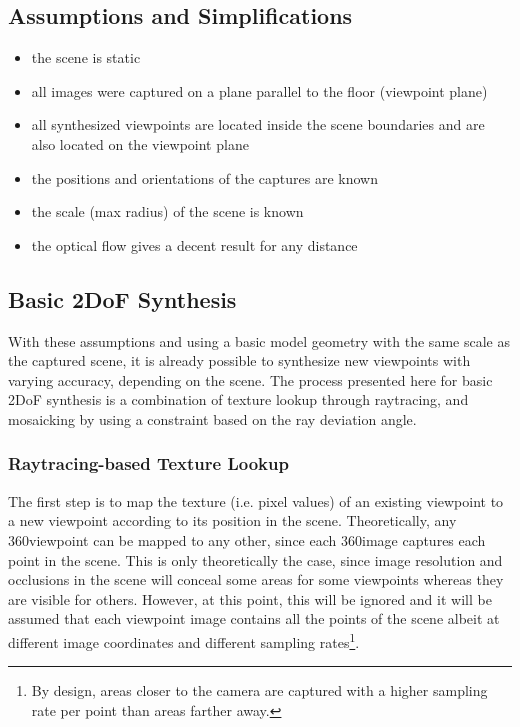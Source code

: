 \subsection{Assumptions and Simplifications}
\begin{itemize}
  \item the scene is static
  \item all images were captured on a plane parallel to the floor (viewpoint plane)
  \item all synthesized viewpoints are located inside the scene boundaries and are also located on the viewpoint plane
  \item the positions and orientations of the captures are known
  \item the scale (max radius) of the scene is known
  \item the optical flow gives a decent result for any distance
\end{itemize}

\subsection{Basic 2DoF Synthesis} \label{subsec:basic-synthesis}
With these assumptions and using a basic model geometry with the same scale as the captured scene, it is already possible to synthesize new viewpoints with varying accuracy, depending on the scene. The process presented here for basic 2DoF synthesis is a combination of texture lookup through raytracing, and mosaicking by using a constraint based on the ray deviation angle.

\subsubsection{Raytracing-based Texture Lookup}
The first step is to map the texture (i.e. pixel values) of an existing viewpoint to a new viewpoint according to its position in the scene. Theoretically, any 360\degree viewpoint can be mapped to any other, since each 360\degree image captures each point in the scene. This is only theoretically the case, since image resolution and occlusions in the scene will conceal some areas for some viewpoints whereas they are visible for others. However, at this point, this will be ignored and it will be assumed that each viewpoint image contains all the points of the scene albeit at different image coordinates and different sampling rates\footnote{By design, areas closer to the camera are captured with a higher sampling rate per point than areas farther away.}. 

